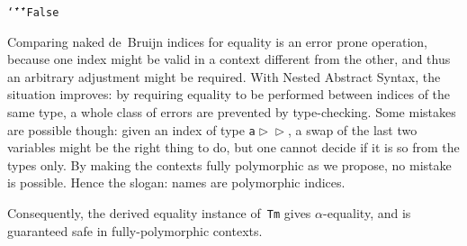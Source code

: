 \documentclass[9pt,authoryear]{sigplanconf}
\begin{document}
{{}\vphantom{$\{$}}\texttt{\mbox{\hspace{0.50em}}}\texttt{\mbox{\hspace{0.50em}}}\texttt{\makebox[1.22ex][c]{\_{}}}\texttt{\mbox{\hspace{0.50em}}}\texttt{\mbox{\hspace{0.50em}}}\texttt{\mbox{\hspace{0.50em}}}\texttt{\mbox{\hspace{0.50em}}}\texttt{\mbox{\hspace{0.50em}}}\texttt{{\char `\=}{\char `\=}}\texttt{\mbox{\hspace{0.50em}}}\texttt{\makebox[1.22ex][c]{\_{}}}\texttt{\mbox{\hspace{0.50em}}}\texttt{\mbox{\hspace{0.50em}}}\texttt{\mbox{\hspace{0.50em}}}\texttt{\mbox{\hspace{0.50em}}}\texttt{\mbox{\hspace{0.50em}}}\texttt{{\char `\=}}\texttt{\mbox{\hspace{0.50em}}}\texttt{False}\texttt{{\nopagebreak \newline%
}\vphantom{$\{$}}%


%
Comparing naked de{~}Bruijn indices for equality is an error prone
    operation, because one index might be valid in a context different
    from the other, and thus an arbitrary adjustment might be required.
    With Nested Abstract Syntax, the situation improves{:} by requiring
    equality to be performed between indices of the same type, a whole
    class of errors are prevented by type-checking. Some mistakes are
    possible though{:} given an index of type \texttt{a}\texttt{\mbox{\hspace{0.50em}}}\texttt{$ \vartriangleright $}\texttt{\mbox{\hspace{0.50em}}}\texttt{\makebox[1.22ex][l]{$ {(} $}}\texttt{\makebox[1.22ex][r]{$ {)} $}}\texttt{\mbox{\hspace{0.50em}}}\texttt{$ \vartriangleright $}\texttt{\mbox{\hspace{0.50em}}}\texttt{\makebox[1.22ex][l]{$ {(} $}}\texttt{\makebox[1.22ex][r]{$ {)} $}}, a swap
    of the last two variables might be the right thing to do, but
    one cannot decide if it is so from the types only. By making the
    contexts fully polymorphic as we propose, no mistake is possible.
    Hence the slogan{:} names are polymorphic indices.%


%
Consequently, the derived equality instance of{~}\texttt{Tm} gives
    $ \alpha $-equality, and is guaranteed safe in fully-polymorphic contexts.%
\end{document}
